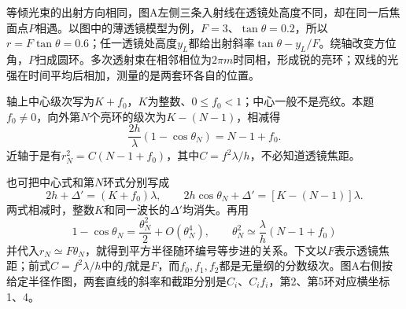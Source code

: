 \documentclass[UTF8,fontset=fandol,a4paper,11pt]{ctexart}
\begin{document}
等倾光束的出射方向相同，图A左侧三条入射线在透镜处高度不同，却在同一后焦面点$P$相遇。以图中的薄透镜模型为例，$F=3$、$\tan\theta=0.2$，所以$r=F\tan\theta=0.6$；任一透镜处高度$y_L$都给出射斜率$\tan\theta-y_L/F$。绕轴改变方位角，$P$扫成圆环。多次透射束在相邻相位为$2\pi m$时同相，形成锐的亮环；双线的光强在时间平均后相加，测量的是两套环各自的位置。

轴上中心级次写为$K+f_0$，$K$为整数、$0\le f_0<1$；中心一般不是亮纹。本题$f_0\ne0$，向外第$N$个亮环的级次为$K-(N-1)$，相减得
\[
\frac{2h}{\lambda}(1-\cos\theta_N)=N-1+f_0.
\]
近轴于是有$r_N^2=C(N-1+f_0)$，其中$C=f^2\lambda/h$，不必知道透镜焦距。

也可把中心式和第$N$环式分别写成
\[
2h+\Delta'=(K+f_0)\lambda,\qquad
2h\cos\theta_N+\Delta'=[K-(N-1)]\lambda.
\]
两式相减时，整数$K$和同一波长的$\Delta'$均消失。再用
\[
1-\cos\theta_N=\frac{\theta_N^2}{2}+O(\theta_N^4),\qquad
\theta_N^2\simeq\frac{\lambda}{h}(N-1+f_0)
\]
并代入$r_N\simeq F\theta_N$，就得到平方半径随环编号等步进的关系。下文以$F$表示透镜焦距；前式$C=f^2\lambda/h$中的$f$就是$F$，而$f_0,f_1,f_2$都是无量纲的分数级次。图A右侧按给定半径作图，两套直线的斜率和截距分别是$C_i$、$C_i f_i$，第2、第5环对应横坐标1、4。
\end{document}
